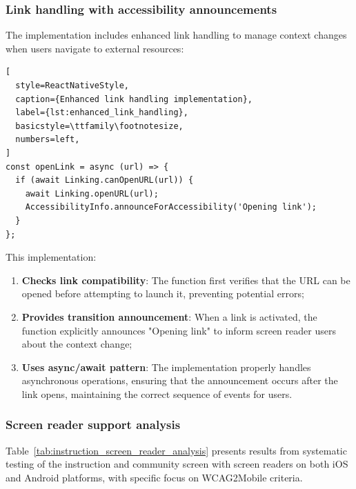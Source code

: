 \subsubsection{Link handling with accessibility announcements}
\label{subsubsec:instruction-link-handling}

The implementation includes enhanced link handling to manage context changes when users navigate to external resources:

\begin{lstlisting}[
  style=ReactNativeStyle,
  caption={Enhanced link handling implementation},
  label={lst:enhanced_link_handling},
  basicstyle=\ttfamily\footnotesize,
  numbers=left,
]
const openLink = async (url) => {
  if (await Linking.canOpenURL(url)) {
    await Linking.openURL(url);
    AccessibilityInfo.announceForAccessibility('Opening link');
  }
};
\end{lstlisting}
\FloatBarrier

This implementation:

\begin{enumerate}
    \item \textbf{Checks link compatibility}: The function first verifies that the URL can be opened before attempting to launch it, preventing potential errors;
    
    \item \textbf{Provides transition announcement}: When a link is activated, the function explicitly announces "Opening link" to inform screen reader users about the context change;
    
    \item \textbf{Uses async/await pattern}: The implementation properly handles asynchronous operations, ensuring that the announcement occurs after the link opens, maintaining the correct sequence of events for users.
\end{enumerate}

\subsubsection{Screen reader support analysis}
\label{subsubsec:instruction-screen-reader-analysis}

Table~\ref{tab:instruction_screen_reader_analysis} presents results from systematic testing of the instruction and community screen with screen readers on both iOS and Android platforms, with specific focus on WCAG2Mobile criteria.

